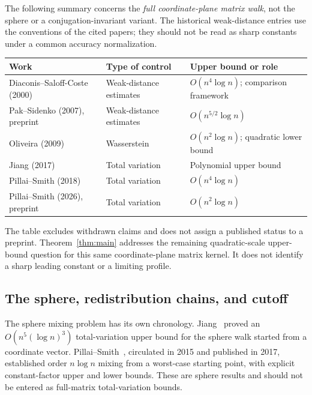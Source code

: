 \documentclass[11pt]{article}
\theoremstyle{definition}\newtheorem{definition}[theorem]{Definition}
\theoremstyle{remark}\newtheorem{remark}[theorem]{Remark}
\begin{document}
The following summary concerns the \emph{full coordinate-plane matrix walk}, not the sphere or a conjugation-invariant variant. The historical weak-distance entries use the conventions of the cited papers; they should not be read as sharp constants under a common accuracy normalization.
\begin{center}
\small
\begin{tabular}{>{\raggedright\arraybackslash}p{}>{\raggedright\arraybackslash}p{}>{\raggedright\arraybackslash}p{}}
\toprule
Work & Type of control & Upper bound or role\\
\midrule
Diaconis--Saloff-Coste (2000)~\cite{DSC00} & Weak-distance estimates & $O(n^4\log n)$; comparison framework\\[3pt]
Pak--Sidenko (2007), preprint~\cite{PakSidenko07} & Weak-distance estimates & $O(n^{5/2}\log n)$\\[3pt]
Oliveira (2009)~\cite{Oliveira} & Wasserstein & $O(n^2\log n)$; quadratic lower bound\\[3pt]
Jiang (2017)~\cite{Jiang17} & Total variation & Polynomial upper bound\\[3pt]
Pillai--Smith (2018)~\cite{PS18} & Total variation & $O(n^4\log n)$\\[3pt]
Pillai--Smith (2026), preprint~\cite{PS26} & Total variation & $O(n^2\log n)$\\
\bottomrule
\end{tabular}
\end{center}
The table excludes withdrawn claims and does not assign a published status to a preprint. Theorem~\ref{thm:main} addresses the remaining quadratic-scale upper-bound question for this same coordinate-plane matrix kernel. It does not identify a sharp leading constant or a limiting profile.

\subsection{The sphere, redistribution chains, and cutoff}
The sphere mixing problem has its own chronology. Jiang~\cite{Jiang12} proved an $O(n^5(\log n)^3)$ total-variation upper bound for the sphere walk started from a coordinate vector. Pillai--Smith~\cite{PS17}, circulated in 2015 and published in 2017, established order $n\log n$ mixing from a worst-case starting point, with explicit constant-factor upper and lower bounds. These are sphere results and should not be entered as full-matrix total-variation bounds.
\end{document}

